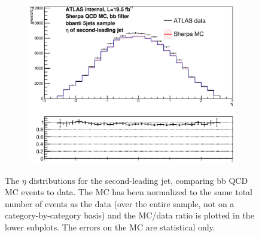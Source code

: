 \begin{figure}[phtb!]
\begin{center}
  \begin{subfigure}[$bbanti$ 5+ jet category]{0.3\textwidth}\includegraphics[width=\textwidth]{MonteCarlo/figures/eta1_bbanti_5jets.eps}\end{subfigure}
  \caption{The $\eta$ distributions for the second-leading jet, comparing bb QCD MC events to data.  The MC has been normalized
  to the same total number of events as the data (over the entire sample, not on a category-by-category basis)
  and the MC/data ratio is plotted in the lower subplots.  The errors on the MC are statistical only.
  \label{fig:bb_qcd_mc_eta1}}
    \end{center}
\end{figure}






